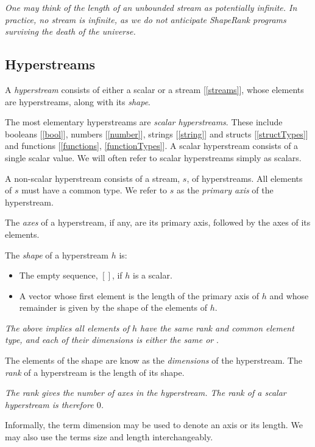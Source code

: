 \documentclass{article}
\begin{document}
{\em One may think of the length of an unbounded stream as potentially infinite. In practice, no stream is infinite, as we do not anticipate ShapeRank programs surviving the death of the universe.
}

\subsection{Hyperstreams}
\label{hyperstreams}

A {\em hyperstream} consists of either a scalar or a stream [\ref{streams}], whose elements are hyperstreams, along with 
 its  {\em shape}. 

The most elementary hyperstreams are {\em scalar hyperstreams}. These include  booleans [\ref{bool}], numbers [\ref{number}], strings [\ref{string}] and  structs [\ref{structTypes}] and functions [\ref{functions}, \ref{functionTypes}]. A scalar hyperstream consists of a single scalar value.  We will often refer to scalar hyperstreams simply as scalars.

A non-scalar hyperstream consists of a stream, $s$, of hyperstreams. All elements of $s$ must have a common type.
We refer to $s$ as the {\em primary axis} of the hyperstream.

The {\em axes} of a hyperstream, if any, are its primary axis, followed by the axes of its elements. 

The {\em shape} of a hyperstream $h$ is:
\begin{itemize}
\item  The empty sequence, $[]$, if  $h$ is a scalar. 
\item A vector whose first element is the length of the primary axis of $h$ and whose remainder is given by the shape of the elements of $h$. 
\end{itemize}

{\em The above implies all elements of $h$ have the same rank and common element type, and each of their dimensions is either the same or \QUESTIONMARK}.
 
The elements of the shape are know as  the {\em dimensions} of the hyperstream.
 The {\em rank} of a hyperstream is the length of its shape.

{\em
The rank  gives the number of axes in the hyperstream. The rank of a scalar hyperstream is therefore $0$.
}

Informally, the term dimension may be used to denote an axis or its length. We may also use the terms size and length interchangeably.
\end{document}
